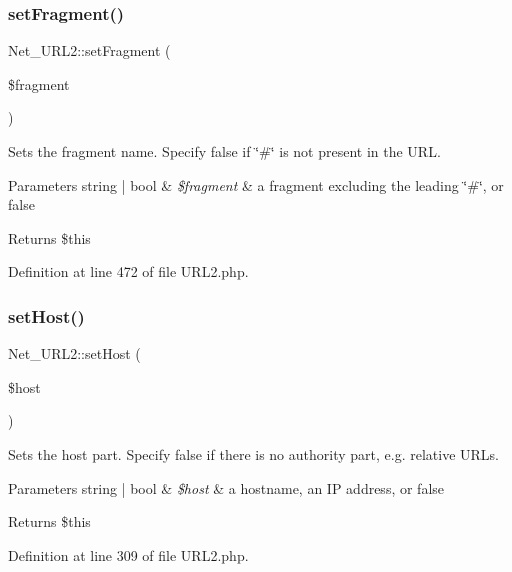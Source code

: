 \subsubsection{\texorpdfstring{set\+Fragment()}{setFragment()}}
{\footnotesize\ttfamily Net\+\_\+\+U\+R\+L2\+::set\+Fragment (\begin{DoxyParamCaption}\item[{}]{\$fragment }\end{DoxyParamCaption})}

Sets the fragment name. Specify false if \char`\"{}\#\char`\"{} is not present in the U\+RL.


\begin{DoxyParams}[1]{Parameters}
string | bool & {\em \$fragment} & a fragment excluding the leading \char`\"{}\#\char`\"{}, or false\\
\hline
\end{DoxyParams}
\begin{DoxyReturn}{Returns}
\$this 
\end{DoxyReturn}


Definition at line 472 of file U\+R\+L2.\+php.

\mbox{\label{classNet__URL2_afacc7bf64786203c167c2d771f1fddf9}} 
\subsubsection{\texorpdfstring{set\+Host()}{setHost()}}
{\footnotesize\ttfamily Net\+\_\+\+U\+R\+L2\+::set\+Host (\begin{DoxyParamCaption}\item[{}]{\$host }\end{DoxyParamCaption})}

Sets the host part. Specify false if there is no authority part, e.\+g. relative U\+R\+Ls.


\begin{DoxyParams}[1]{Parameters}
string | bool & {\em \$host} & a hostname, an IP address, or false\\
\hline
\end{DoxyParams}
\begin{DoxyReturn}{Returns}
\$this 
\end{DoxyReturn}


Definition at line 309 of file U\+R\+L2.\+php.

